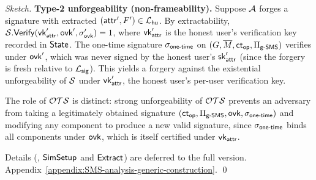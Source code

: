 \begin{proof}[Sketch]
\medskip
\noindent\textbf{Type-2 unforgeability (non-frameability).}
Suppose $\mathcal{A}$ forges a signature with extracted $(\mathsf{attr}', F') \in \mathcal{L}_\mathsf{hu}$.
By extractability, $\mathcal{S}.\mathsf{Verify}(\mathsf{vk}_\mathsf{attr}', \mathsf{ovk}', \sigma_{\mathsf{ovk}}') = 1$,
where $\mathsf{vk}_\mathsf{attr}'$ is the honest user's verification key recorded in $\mathsf{State}$.
The one-time signature $\sigma_{\mathsf{one}\textsf{-}\mathsf{time}}$ on $(G, \overline{M}, \mathsf{ct}_\mathsf{op}, \Pi_{\mathsf{g}\textsf{-}\mathsf{SMS}})$
verifies under $\mathsf{ovk}'$, which was never signed by the honest user's $\mathsf{sk}_\mathsf{attr}'$
(since the forgery is fresh relative to $\mathcal{L}_\mathsf{sig}$).
This yields a forgery against the existential unforgeability of $\mathcal{S}$
under $\mathsf{vk}_\mathsf{attr}'$, the honest user's per-user verification key.

The role of $\mathcal{OTS}$ is distinct: strong unforgeability of $\mathcal{OTS}$
prevents an adversary from taking a legitimately obtained signature
$(\mathsf{ct}_\mathsf{op}, \Pi_{\mathsf{g}\textsf{-}\mathsf{SMS}}, \mathsf{ovk}, \sigma_{\mathsf{one}\textsf{-}\mathsf{time}})$ and modifying any component
to produce a new valid signature, since $\sigma_{\mathsf{one}\textsf{-}\mathsf{time}}$ binds all components
under $\mathsf{ovk}$, which is itself certified under $\mathsf{vk}_\mathsf{attr}$.

\medskip
Details (\eg, $\mathsf{SimSetup}$ and $\mathsf{Extract}$)
are deferred to \ifcameraready the full version.
\else Appendix~\ref{appendix:SMS-analysis-generic-construction}.
\fi
\qed
\end{proof}